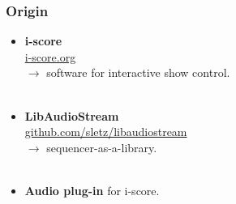 \documentclass{beamer}
\begin{document}
\begin{frame}	
    \frametitle{Origin}    
    \Large
    \begin{itemize}
        \item \textbf{i-score}~\\ \url{i-score.org}~\\$\rightarrow$ software for interactive show control.~\\~\\
        \item \textbf{LibAudioStream}\\ \url{github.com/sletz/libaudiostream}~\\$\rightarrow$ sequencer-as-a-library.~\\~\\
        \item \textbf{Audio plug-in} for i-score.
    \end{itemize}   
     
\end{frame}


\begin{frame}
    \Huge
\end{frame}
    
    
\begin{frame}[plain]
\end{frame}
\end{document}
